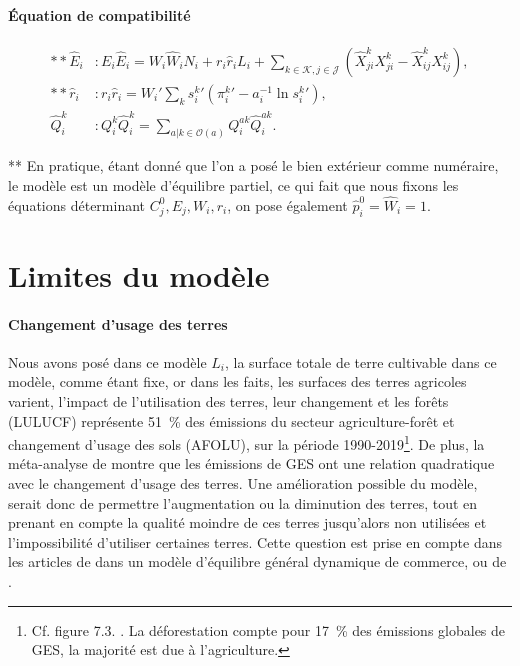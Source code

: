 \paragraph{Équation de compatibilité}
\begin{align}
    ** \hat{E}_i & : E_i \hat{E}_i = W_i \hat{W}_i N_i + r_i \hat{r}_i L_i + \sum_{k \in \mathcal{K},j \in \mathcal{J}} \left(\hat{X}_{ji}^k X_{ji}^k - \hat{X}_{ij}^k X_{ij}^k \right), \\
    ** \hat{r}_i & : r_i \hat{r}_i = W_i\prime \sum_k {s_i^k}\prime \left( {\pi_i^k}\prime -a_i^{-1} \ln {s_i^k}\prime\right),                                                           \\
    \hat{Q}_i^k  & : Q_i^k \hat{Q}_i^k = \sum_{a|k\in \mathcal{O}(a)} Q_i^{ak} \hat{Q}_i^{ak}.
\end{align}

** En pratique, étant donné que l’on a posé le bien extérieur comme numéraire, le modèle est un modèle d’équilibre partiel, ce qui fait que nous fixons les équations déterminant $C_j^0, E_j, W_i, r_i$, on pose également $\hat{p}_i^0=\hat{W}_i=1$.



\section{Limites du modèle}

\paragraph{Changement d’usage des terres} Nous avons posé dans ce modèle $L_i$, la surface totale de terre cultivable dans ce modèle, comme étant fixe, or dans les faits, les surfaces des terres agricoles varient, l’impact de l'utilisation des terres, leur changement et les forêts (LULUCF) représente 51~\% des émissions du secteur agriculture-forêt et changement d'usage des sols (AFOLU), sur la période 1990-2019\footnote{Cf. figure 7.3. \cite{IPCCAR6GR3}. La déforestation compte pour 17~\% des émissions globales de GES, la majorité est due à l'agriculture.}. De plus, la méta-analyse de \cite{Huang2023} montre que les émissions de GES ont une relation quadratique avec le changement d'usage des terres. Une amélioration possible du modèle, serait donc de permettre l’augmentation ou la diminution des terres, tout en prenant en compte la qualité moindre de ces terres jusqu’alors non utilisées et l’impossibilité d’utiliser certaines terres. Cette question est prise en compte dans les articles de \cite{Farrokhi2023} dans un modèle d'équilibre général dynamique de commerce, ou de \cite{Costinot2016}.

